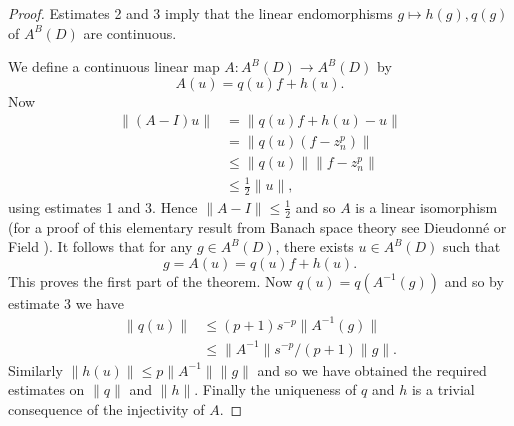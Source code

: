 \begin{proof}
Estimates 2 and 3 imply that the linear endomorphisms $g\mapsto h(g),q(g)$ of $A^B(D)$ are continuous.

We define a continuous linear map $A:A^B(D)\to A^B(D)$ by
\[A(u)=q(u)f+h(u).\]
Now
\begin{align*}
\|(A-I)u\|&=\|q(u)f+h(u)-u\|\\
&=\|q(u)(f-z_n^p)\|\\
&\leq\|q(u)\|\|f-z_n^p\|\\
&\leq\tfrac12\|u\|,
\end{align*}
using estimates 1 and 3. Hence $\|A-I\|\leq\tfrac12$ and so $A$ is a linear isomorphism (for a proof of this elementary result from Banach space theory see Dieudonn\'e \cite[page 148]{bib:I:dieudonne-j:1} or Field \cite[page 189]{bib:I:field-m-j:1}). It follows that for any $g\in A^B(D)$, there exists $u\in A^B(D)$ such that
\[g=A(u)=q(u)f+h(u).\]
This proves the first part of the theorem. Now $q(u)=q(A^{-1}(g))$ and so by estimate 3 we have
\begin{align*}
\|q(u)\|&\leq(p+1)s^{-p}\|A^{-1}(g)\|\\
&\leq\|A^{-1}\|s^{-p}/(p+1)\|g\|.
\end{align*}
Similarly $\|h(u)\|\leq p\|A^{-1}\|\|g\|$ and so we have obtained the required estimates on $\|q\|$ and $\|h\|$. Finally the uniqueness of $q$ and $h$ is a trivial consequence of the injectivity of $A$.
\end{proof}
